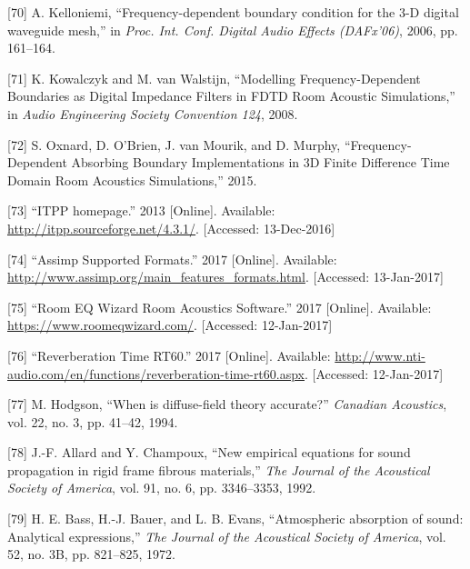 \documentclass[]{scrreprt}
\begin{document}
\hypertarget{ref-kelloniemiux5ffrequency-dependentux5f2006}{}
{[}70{]} A. Kelloniemi, ``Frequency-dependent boundary condition for the
3-D digital waveguide mesh,'' in \emph{Proc. Int. Conf. Digital Audio
Effects (DAFx'06)}, 2006, pp. 161--164.

\hypertarget{ref-kowalczykux5fmodellingux5f2008}{}
{[}71{]} K. Kowalczyk and M. van Walstijn, ``Modelling
Frequency-Dependent Boundaries as Digital Impedance Filters in FDTD Room
Acoustic Simulations,'' in \emph{Audio Engineering Society Convention
124}, 2008.

\hypertarget{ref-oxnardux5ffrequency-dependentux5f2015}{}
{[}72{]} S. Oxnard, D. O'Brien, J. van Mourik, and D. Murphy,
``Frequency-Dependent Absorbing Boundary Implementations in 3D Finite
Difference Time Domain Room Acoustics Simulations,'' 2015.

\hypertarget{ref-ux5fitppux5f2013}{}
{[}73{]} ``ITPP homepage.'' 2013 {[}Online{]}. Available:
\url{http://itpp.sourceforge.net/4.3.1/}. {[}Accessed: 13-Dec-2016{]}

\hypertarget{ref-ux5fassimpux5f2017}{}
{[}74{]} ``Assimp Supported Formats.'' 2017 {[}Online{]}. Available:
\url{http://www.assimp.org/main_features_formats.html}. {[}Accessed:
13-Jan-2017{]}

\hypertarget{ref-ux5froomux5f2017}{}
{[}75{]} ``Room EQ Wizard Room Acoustics Software.'' 2017 {[}Online{]}.
Available: \url{https://www.roomeqwizard.com/}. {[}Accessed:
12-Jan-2017{]}

\hypertarget{ref-ux5freverberationux5f2017}{}
{[}76{]} ``Reverberation Time RT60.'' 2017 {[}Online{]}. Available:
\url{http://www.nti-audio.com/en/functions/reverberation-time-rt60.aspx}.
{[}Accessed: 12-Jan-2017{]}

\hypertarget{ref-hodgsonux5fwhenux5f1994}{}
{[}77{]} M. Hodgson, ``When is diffuse-field theory accurate?''
\emph{Canadian Acoustics}, vol. 22, no. 3, pp. 41--42, 1994.

\hypertarget{ref-allardux5fnewux5f1992}{}
{[}78{]} J.-F. Allard and Y. Champoux, ``New empirical equations for
sound propagation in rigid frame fibrous materials,'' \emph{The Journal
of the Acoustical Society of America}, vol. 91, no. 6, pp. 3346--3353,
1992.

\hypertarget{ref-bassux5fatmosphericux5f1972}{}
{[}79{]} H. E. Bass, H.-J. Bauer, and L. B. Evans, ``Atmospheric
absorption of sound: Analytical expressions,'' \emph{The Journal of the
Acoustical Society of America}, vol. 52, no. 3B, pp. 821--825, 1972.
\end{document}

